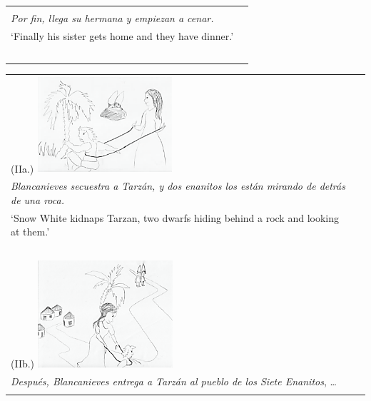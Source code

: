 \documentclass[output=paper]{langsci/langscibook}
\begin{document}
\begin{table}
\begin{tabularx}{\textwidth}{p{5cm}p{6cm}}
\begin{minipage}[t]{5cm}
\end{minipage}& \begin{minipage}[t]{6cm}
\ \\
\textit{Por fin, llega su hermana y empiezan a cenar.}\\
{‘Finally his sister gets home and they have dinner.’}
\end{minipage}\\
\ \\
\end{tabularx}
\end{table}



\begin{table}
\begin{tabularx}{\textwidth}{p{5cm}p{6cm}}
\begin{minipage}[t]{5cm}(IIa.)
\includegraphics[width=5cm]{figures/UTH-img14.png}
\end{minipage}& \begin{minipage}[t]{6cm}
\ \\
\textit{Blancanieves secuestra a Tarzán, y dos enanitos los están mirando de detrás de una roca.}\\
{‘Snow White kidnaps Tarzan, two dwarfs hiding behind a rock and looking at them.’}
\end{minipage}\\
\ \\
\begin{minipage}[t]{5cm}(IIb.)
\includegraphics[width=5cm]{figures/UTH-img15.png}
\end{minipage}& \begin{minipage}[t]{6cm}
\ \\
\textit{Después, Blancanieves entrega a Tarzán al pueblo de los Siete Enanitos}, …\\

\end{minipage}
\end{tabularx}
\end{table}
\end{document}
